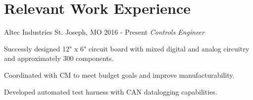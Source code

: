 \documentclass[]{bergman-cv} %
\begin{document}
\section{Relevant Work Experience}
\begin{entrylist}
\entry
{Altec Industries}
{St. Joseph, MO}
{2016 - Present}
{\emph{Controls Engineer}}
{\begin{itemizenosep}
	\item Successly designed 12" x 6" circuit board with mixed digital and analog circuitry and approximately 300 components.
	
	\item Coordinated with CM to meet budget goals and improve  manufacturability.
	
	\item Developed automated test harness with CAN datalogging capabilities.
	

\end{itemizenosep}}
\end{entrylist}
\end{document}
